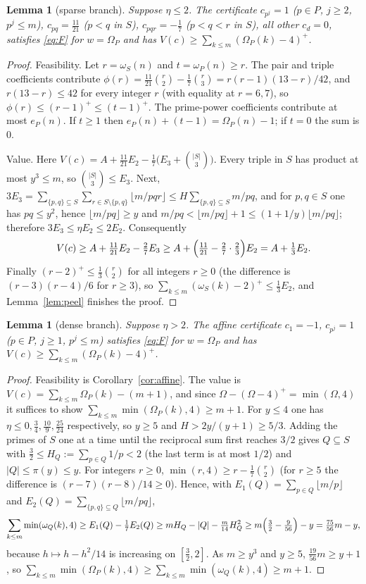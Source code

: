 \documentclass[11pt]{article}
\newtheorem{lemma}[theorem]{Lemma}
\theoremstyle{definition}
\begin{document}
\begin{lemma}[sparse branch]\label{lem:sparse}
Suppose $\eta\le2$. The certificate $c_{p^j}=1$ ($p\in P$, $j\ge2$, $p^j\le m$), $c_{pq}=\tfrac{11}{21}$ ($p<q$ in $S$),
$c_{pqr}=-\tfrac17$ ($p<q<r$ in $S$), all other $c_d=0$, satisfies \eqref{eq:F} for $w=\Omega_P$ and has
$V(c)\ge\sum_{k\le m}(\Omega_P(k)-4)^+$.
\end{lemma}
\begin{proof}
Feasibility. Let $r=\omega_S(n)$ and $t=\omega_P(n)\ge r$. The pair and triple coefficients contribute
$\phi(r)=\tfrac{11}{21}\binom r2-\tfrac17\binom r3=r(r-1)(13-r)/42$, and $r(13-r)\le42$ for every integer $r$ (with equality at
$r=6,7$), so $\phi(r)\le(r-1)^+\le(t-1)^+$. The prime-power coefficients contribute at most $e_P(n)$. If $t\ge1$ then
$e_P(n)+(t-1)=\Omega_P(n)-1$; if $t=0$ the sum is $0$.

Value. Here $V(c)=A+\tfrac{11}{21}E_2-\tfrac17\bigl(E_3+\binom{|S|}3\bigr)$. Every triple in $S$ has product at most $y^3\le m$, so
$\binom{|S|}3\le E_3$. Next, $3E_3=\sum_{\{p,q\}\subseteq S}\sum_{r\in S\setminus\{p,q\}}\lfloor m/pqr\rfloor\le
H\sum_{\{p,q\}\subseteq S}m/pq$, and for $p,q\in S$ one has $pq\le y^2$, hence $\lfloor m/pq\rfloor\ge y$ and
$m/pq<\lfloor m/pq\rfloor+1\le(1+1/y)\lfloor m/pq\rfloor$; therefore $3E_3\le\eta E_2\le2E_2$. Consequently
\[
V(c)\ge A+\tfrac{11}{21}E_2-\tfrac27E_3\ge A+\Bigl(\tfrac{11}{21}-\tfrac27\cdot\tfrac23\Bigr)E_2=A+\tfrac13E_2 .
\]
Finally $(r-2)^+\le\tfrac13\binom r2$ for all integers $r\ge0$ (the difference is $(r-3)(r-4)/6$ for $r\ge3$), so
$\sum_{k\le m}(\omega_S(k)-2)^+\le\tfrac13E_2$, and Lemma~\ref{lem:peel} finishes the proof.
\end{proof}

\begin{lemma}[dense branch]\label{lem:dense}
Suppose $\eta>2$. The affine certificate $c_1=-1$, $c_{p^j}=1$ ($p\in P$, $j\ge1$, $p^j\le m$) satisfies \eqref{eq:F} for
$w=\Omega_P$ and has $V(c)\ge\sum_{k\le m}(\Omega_P(k)-4)^+$.
\end{lemma}
\begin{proof}
Feasibility is Corollary~\ref{cor:affine}. The value is $V(c)=\sum_{k\le m}\Omega_P(k)-(m+1)$, and since
$\Omega-(\Omega-4)^+=\min(\Omega,4)$ it suffices to show $\sum_{k\le m}\min(\Omega_P(k),4)\ge m+1$.
For $y\le4$ one has $\eta\le0,\tfrac34,\tfrac{10}9,\tfrac{25}{24}$ respectively, so $y\ge5$ and $H>2y/(y+1)\ge5/3$. Adding the
primes of $S$ one at a time until the reciprocal sum first reaches $3/2$ gives $Q\subseteq S$ with $\tfrac32\le H_Q:=\sum_{p\in Q}1/p<2$
(the last term is at most $1/2$) and $|Q|\le\pi(y)\le y$. For integers $r\ge0$, $\min(r,4)\ge r-\tfrac17\binom r2$ (for $r\ge5$
the difference is $(r-7)(r-8)/14\ge0$). Hence, with $E_1(Q)=\sum_{p\in Q}\lfloor m/p\rfloor$ and $E_2(Q)=\sum_{\{p,q\}\subseteq Q}\lfloor m/pq\rfloor$,
\[
\sum_{k\le m}\min(\omega_Q(k),4)\ge E_1(Q)-\tfrac17E_2(Q)\ge mH_Q-|Q|-\tfrac m{14}H_Q^2\ge m\Bigl(\tfrac32-\tfrac{9}{56}\Bigr)-y=\tfrac{75}{56}m-y,
\]
because $h\mapsto h-h^2/14$ is increasing on $[\tfrac32,2]$. As $m\ge y^3$ and $y\ge5$, $\tfrac{19}{56}m\ge y+1$, so
$\sum_{k\le m}\min(\Omega_P(k),4)\ge\sum_{k\le m}\min(\omega_Q(k),4)\ge m+1$.
\end{proof}
\end{document}

